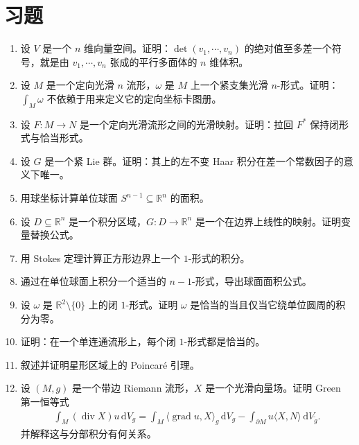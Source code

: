 \documentclass[../../main.tex]{subfiles}
\begin{document}
\section{习题}\label{section:ch16-problems}

\begin{enumerate}
\item\label{exercise:ch16-01} 设 $V$ 是一个 $n$ 维向量空间。证明：$\det(v_1,\cdots ,v_n)$ 的绝对值至多差一个符号，就是由 $v_1,\cdots ,v_n$ 张成的平行多面体的 $n$ 维体积。
\item\label{exercise:ch16-02} 设 $M$ 是一个定向光滑 $n$ 流形，$\omega$ 是 $M$ 上一个紧支集光滑 $n$-形式。证明：$\int_M\omega$ 不依赖于用来定义它的定向坐标卡图册。
\item\label{exercise:ch16-03} 设 $F:M\to N$ 是一个定向光滑流形之间的光滑映射。证明：拉回 $F^*$ 保持闭形式与恰当形式。
\item\label{exercise:ch16-04} 设 $G$ 是一个紧 Lie 群。证明：其上的左不变 Haar 积分在差一个常数因子的意义下唯一。
\item\label{exercise:ch16-05} 用球坐标计算单位球面 $S^{n-1}\subseteq\mathbb{R}^n$ 的面积。
\item\label{exercise:ch16-06} 设 $D\subseteq\mathbb{R}^n$ 是一个积分区域，$G:D\to\mathbb{R}^n$ 是一个在边界上线性的映射。证明变量替换公式。
\item\label{exercise:ch16-07} 用 Stokes 定理计算正方形边界上一个 $1$-形式的积分。
\item\label{exercise:ch16-08} 通过在单位球面上积分一个适当的 $n-1$-形式，导出球面面积公式。
\item\label{exercise:ch16-09} 设 $\omega$ 是 $\mathbb{R}^2\setminus\{0\}$ 上的闭 $1$-形式。证明 $\omega$ 是恰当的当且仅当它绕单位圆周的积分为零。
\item\label{exercise:ch16-10} 证明：在一个单连通流形上，每个闭 $1$-形式都是恰当的。
\item\label{exercise:ch16-11} 叙述并证明星形区域上的 Poincaré 引理。
\item\label{exercise:ch16-12} 设 $(M,g)$ 是一个带边 Riemann 流形，$X$ 是一个光滑向量场。证明 Green 第一恒等式
\begin{align*}
\int_M(\operatorname{div}X)u\,\mathrm{d}V_g=\int_M\langle\operatorname{grad}u,X\rangle_g\,\mathrm{d}V_g-\int_{\partial M}u\langle X,N\rangle\,\mathrm{d}V_{\widetilde g}.
\end{align*}
并解释这与分部积分有何关系。


\end{enumerate}
\end{document}
